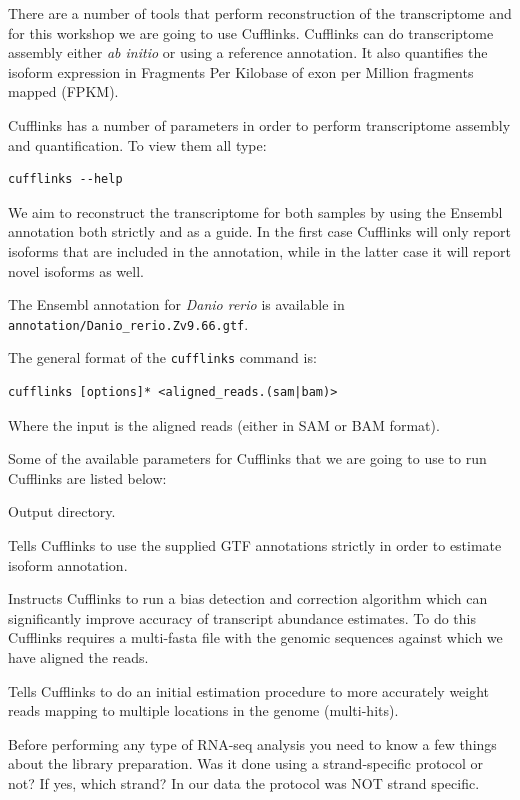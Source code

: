 There are a number of tools that perform reconstruction of the transcriptome
and for this workshop we are going to use Cufflinks. Cufflinks can do
transcriptome assembly either \textit{ab initio} or using a reference annotation. It
also quantifies the isoform expression in Fragments
Per Kilobase of exon per Million fragments mapped (FPKM).

\begin{steps}
Cufflinks has a number of parameters in order to perform transcriptome
assembly and quantification. To view them all type:

\begin{lstlisting}
cufflinks --help
\end{lstlisting}
\end{steps}

We aim to reconstruct the transcriptome for both samples by using the Ensembl
annotation both strictly and as a guide. In the first case Cufflinks will only
report isoforms that are included in the annotation, while in the latter case
it will report novel isoforms as well.

The Ensembl annotation for \textit{Danio rerio} is available in
\texttt{annotation/Danio\_rerio.Zv9.66.gtf}.

\begin{information}
The general format of the \texttt{cufflinks} command is:
\begin{lstlisting}[style=command_syntax]
cufflinks [options]* <aligned_reads.(sam|bam)>
\end{lstlisting}
Where the input is the aligned reads (either in SAM or BAM format).
\end{information}

\begin{note}
Some of the available parameters for Cufflinks that we are going to use to run
Cufflinks are listed below:
\begin{description}[style=multiline,labelindent=0cm,align=right,leftmargin=\descriptionlabelspace,rightmargin=1.5cm,font=\ttfamily]
  \item[-o] Output directory.
  \item[-G] Tells Cufflinks to use the supplied GTF annotations strictly in order
  to estimate isoform annotation.
  \item[-b] Instructs Cufflinks to run a bias detection and correction algorithm
  which can significantly improve accuracy of transcript abundance estimates.
  To do this Cufflinks requires a multi-fasta file with the genomic sequences
  against which we have aligned the reads.
  \item[-u] Tells Cufflinks to do an initial estimation procedure to more
  accurately weight reads mapping to multiple locations in the genome
  (multi-hits).
  \item[--library-type] Before performing any type of RNA-seq analysis you need
  to know a few things about the library preparation. Was it done using a
  strand-specific protocol or not? If yes, which strand? In our data the protocol
  was NOT strand specific.
\end{description}
\end{note}

